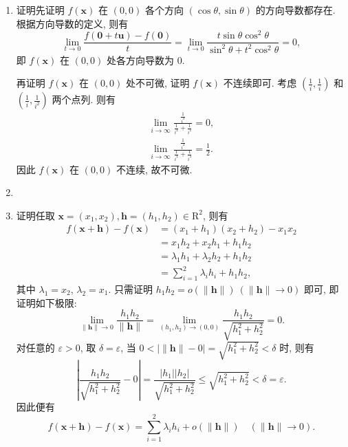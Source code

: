 \documentclass[a4paper, 11pt]{ctexart}
\begin{document}
\begin{enumerate}
    \item %
        {\heiti 证明}\quad 先证明 $f(\boldsymbol{x})$ 在 $(0, 0)$ 各个方向 $(\cos\theta, \sin\theta)$ 的方向导数都存在. 根据方向导数的定义, 则有
        \[
            \lim_{t \to 0}\frac{f(\boldsymbol{0} + t\boldsymbol{u}) - f(\boldsymbol{0})}{t} = \lim_{t\to 0}\frac{t\sin\theta\cos^2\theta}{\sin^2\theta + t^2\cos^2\theta} = 0,    
        \]
        即 $f(\boldsymbol{x})$ 在 $(0, 0)$ 处各方向导数为 0.

        再证明 $f(\boldsymbol{x})$ 在 $(0, 0)$ 处不可微, 证明 $f(\boldsymbol{x})$ 不连续即可. 考虑 $\displaystyle{\left(\frac1i, \frac1i\right)}$ 和 $\displaystyle{\left(\frac1i, \frac{1}{i^2}\right)}$ 两个点列.
        则有
        \begin{gather*}
            \lim_{i\to\infty}\frac{\frac{1}{i^3}}{\frac{1}{i^4} + \frac{1}{i^2}} = 0, \\
            \lim_{i\to\infty}\frac{\frac{1}{i^4}}{\frac{1}{i^4} + \frac{1}{i^4}} = \frac12.   
        \end{gather*}
        因此 $f(\boldsymbol{x})$ 在 $(0, 0)$ 不连续, 故不可微.
    \item %
    \item %
        {\heiti 证明}\quad 任取 $\boldsymbol{x} = (x_1, x_2), \boldsymbol{h} = (h_1, h_2) \in \mathrm{R}^2$, 则有
        \begin{align*}
            f(\boldsymbol{x} + \boldsymbol{h}) - f(\boldsymbol{x}) &= (x_1 + h_1)(x_2 + h_2) - x_1x_2 \\
            &= x_1h_2 + x_2h_1 + h_1h_2 \\
            &= \lambda_1h_1 + \lambda_2h_2 + h_1h_2 \\
            &= \sum_{i=1}^2\lambda_ih_i + h_1h_2,   
        \end{align*}
        其中 $\lambda_1 = x_2$, $\lambda_2 = x_1$. 只需证明 $h_1h_2 = o(\|\boldsymbol{h}\|)\ (\|\boldsymbol{h}\|\to0)$ 即可, 即证明如下极限:
        \[
            \lim_{\|\boldsymbol{h}\|\to0}\frac{h_1h_2}{\|\boldsymbol{h}\|} = \lim_{(h_1, h_2) \to (0, 0)}\frac{h_1h_2}{\sqrt{h_1^2 + h_2^2}} = 0.    
        \]
        对任意的 $\varepsilon > 0$, 取 $\delta = \varepsilon$, 当 $0 < |\|\boldsymbol{h}\| - 0| = \sqrt{h_1^2 + h_2^2} < \delta$ 时, 则有
        \[
            \left| \frac{h_1h_2}{\sqrt{h_1^2+h_2^2}} - 0 \right| = \frac{|h_1||h_2|}{\sqrt{h_1^2+h_2^2}} \leqslant \sqrt{h_1^2 + h_2^2} < \delta = \varepsilon.   
        \]
        因此便有
        \[
            f(\boldsymbol{x} + \boldsymbol{h}) - f(\boldsymbol{x}) = \sum_{i=1}^2\lambda_ih_i + o(\|\boldsymbol{h}\|)\quad (\|\boldsymbol{h}\| \to 0).
\]
\end{enumerate}
\end{document}
